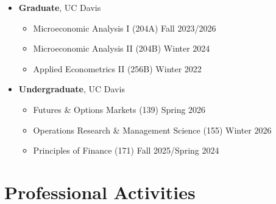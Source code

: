 \documentclass{article}[12]
\begin{document}
\begin{itemize}[itemsep=0.5em]

    \item \textbf{Graduate}, UC Davis
    \begin{itemize}
        \item Microeconomic Analysis I (204A) \hfill Fall 2023/2026
        \item Microeconomic Analysis II (204B) \hfill Winter 2024
        \item Applied Econometrics II (256B) \hfill Winter 2022
    \end{itemize}

    \item \textbf{Undergraduate}, UC Davis
    \begin{itemize}
        \item Futures \& Options Markets (139) \hfill Spring 2026
        \item Operations Research \& Management Science (155) \hfill Winter 2026
        \item Principles of Finance (171) \hfill Fall 2025/Spring 2024
    \end{itemize}

\end{itemize}


\section{Professional Activities}
\end{document}

